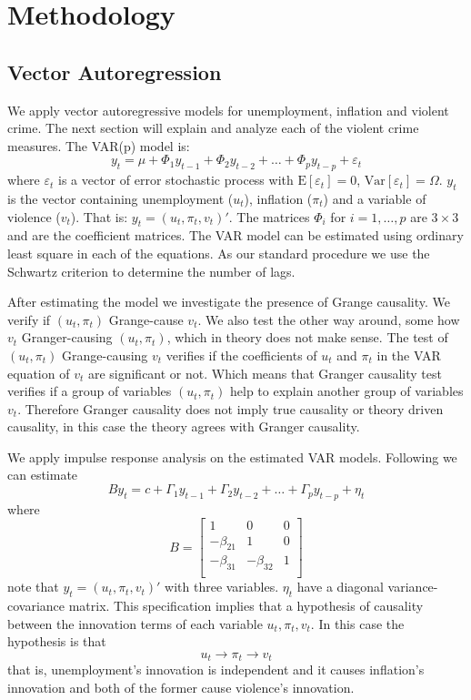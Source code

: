 \documentclass[11pt, a4paper]{article}
\newcommand{\E}{\mathrm{E}}
\newcommand{\Var}{\mathrm{Var}}
\begin{document}
\section{Methodology}

\subsection{Vector Autoregression}

We apply vector autoregressive models for unemployment, inflation and violent crime. The next section will explain and analyze each of the violent crime measures. The VAR(p) model is:
$$ y_t = \mu + \Phi_1 y_{t-1} + \Phi_2 y_{t-2} + \dots + \Phi_p y_{t-p} + \varepsilon_t  $$
where $ \varepsilon_t $ is a vector of error stochastic process with $ \E[\varepsilon_t] = 0 $, $\Var[\varepsilon_t ] = \Omega$. $y_t$ is the vector containing unemployment ($u_t$), inflation ($\pi_t$) and a variable of violence ($v_t$). That is: $ y_t = (u_t,\pi_t, v_t )' $. The matrices $ \Phi_i$ for $i = 1, \dots, p$ are $3 \times 3$ and are the coefficient matrices. The VAR model can be estimated using ordinary least square in each of the equations. As our standard procedure we use the Schwartz criterion to determine the number of lags. 

After estimating the model we investigate the presence of Grange causality. We verify if $(u_t,\pi_t)$ Grange-cause $v_t$. We also test the other way around, some how $v_t$ Granger-causing $(u_t,\pi_t)$, which in theory does not make sense. 
The test of $(u_t,\pi_t)$ Grange-causing $v_t$ verifies if the coefficients of $u_t$ and $\pi_t$ in the VAR equation of $v_t$ are significant or not. 
Which means that Granger causality test verifies if a group of variables $(u_t,\pi_t)$ help to explain another group of variables $v_t$. Therefore Granger causality does not imply true causality or theory driven causality, in this case the theory agrees with Granger causality.

We apply impulse response analysis on the estimated VAR models. Following \cite{sims1980} we can estimate
$$ B y_t = c + \Gamma_1 y_{t-1} + \Gamma_2 y_{t-2} + \dots + \Gamma_p y_{t-p} + \eta_t $$
where 
$$ B = \begin{bmatrix}
1           & 0 & 0 \\
-\beta_{21} & 1 & 0    \\
-\beta_{31} & -\beta_{32} & 1   \\
\end{bmatrix} $$
note that  $y_t = (u_t,\pi_t, v_t )'$ with three variables. $\eta_t$ have a diagonal variance-covariance matrix. This specification implies that a hypothesis of causality between the innovation terms of each variable $u_t, \pi_t, v_t$. In this case the hypothesis is that 
$$ u_t \rightarrow \pi_t \rightarrow v_t $$
that is, unemployment's innovation is independent and it causes inflation's innovation and both of the former cause violence's innovation. 
\end{document}
